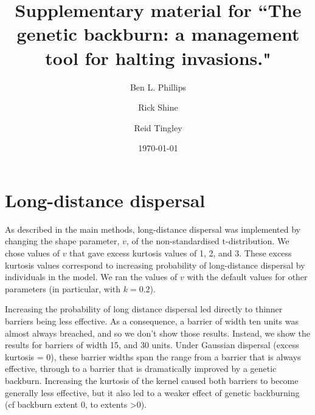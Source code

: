 \documentclass{article}
\begin{document}
\title{Supplementary material for ``The genetic backburn: a management tool for halting invasions."}

\author{Ben L. Phillips}

  
\author{Rick Shine}
  
\author{Reid Tingley}
  


\date{\today}



\maketitle 



\section{Long-distance dispersal}

As described in the main methods, long-distance dispersal was implemented by changing the shape parameter, $v$, of the non-standardised t-distribution.  We chose values of $v$ that gave excess kurtosis values of 1, 2, and 3.  These excess kurtosis values correspond to increasing probability of long-distance dispersal by individuals in the model.  We ran the values of $v$ with the default values for other parameters (in particular, with $k=0.2$).

Increasing the probability of long distance dispersal led directly to thinner barriers being less effective.  As a consequence, a barrier of width ten units was almost always breached, and so we don't show those results.  Instead, we show the results for barriers of width 15, and 30 units.  Under Gaussian dispersal (excess kurtosis = 0), these barrier widths span the range from a barrier that is always effective, through to a barrier that is dramatically improved by a genetic backburn.  Increasing the kurtosis of the kernel caused both barriers to become generally less effective, but it also led to a weaker effect of genetic backburning (cf backburn extent 0, to extents >0).
\end{document}
